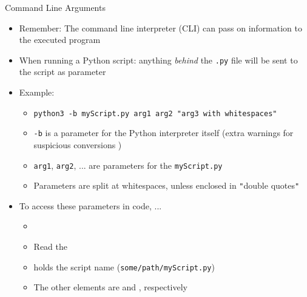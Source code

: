 \begin{frame}{Command Line Arguments}
%
\begin{itemize}
\item Remember: The command line interpreter (CLI) can pass on information to the executed program
\item When running a Python script: anything \emph{behind} the \texttt{.py} file will be sent to the script as parameter
\item Example:
	\begin{itemize}
	\item \texttt{python3 -b myScript.py arg1 arg2 "arg3 with whitespaces"}
	\item \texttt{-b} is a parameter for the Python interpreter itself (extra warnings for suspicious conversions  \thus {})
	\item \texttt{arg1}, \texttt{arg2}, ... are parameters for the \texttt{myScript.py}
	\item Parameters are split at whitespaces, unless enclosed in \texttt{"}double quotes\texttt{"}
	\end{itemize}
\item To access these parameters in code, ...
	\begin{itemize}
	\item {}
	\item Read the 
	\item {} holds the script name (\zB \texttt{some/path/myScript.py})
	\item The other elements are   and , respectively
	\end{itemize}
\end{itemize}
%
\end{frame}


